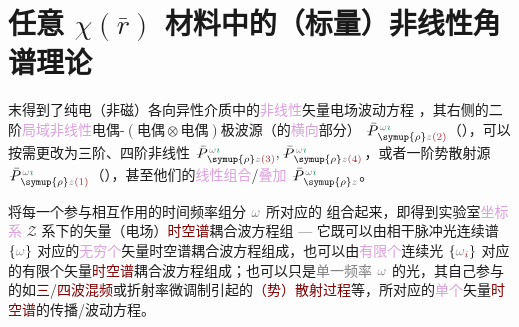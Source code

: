 \chapter{任意 \texorpdfstring{$\chi ( \bar{r} )$}{$\text{χ} ( \bar{r} )$} 材料中的（标量）非线性角谱理论}\label{chap:NLAST}

 末得到了\textcolor{PineGreen}{纯电（非磁）各向异性}介质中的\textcolor{Plum}{非线性}矢量电场波动方程 ，其右侧的二阶\textcolor{Plum}{局域}\textcolor{Plum}{非线性}\textcolor{NavyBlue}{电偶-$(\text{电偶}\otimes\text{电偶})$}极波源（的\textcolor{Plum}{横向}部分） $\Xint{\mathcolor{gray}{-}}{25}{\bar{P}}^{\;\! \mathcolor{gray}{\omega} \textcolor{PineGreen}{\imath}}_{\;\! \symup{\rho} \mathcolor{gray}{z} \textcolor{Maroon}{(2)}}$（），可以按需更改为三阶、四阶非线性 $\Xint{\mathcolor{gray}{-}}{25}{\bar{P}}^{\;\! \mathcolor{gray}{\omega} \textcolor{PineGreen}{\imath}}_{\;\! \symup{\rho} \mathcolor{gray}{z} \textcolor{Maroon}{(3)}}, \Xint{\mathcolor{gray}{-}}{25}{\bar{P}}^{\;\! \mathcolor{gray}{\omega} \textcolor{PineGreen}{\imath}}_{\;\! \symup{\rho} \mathcolor{gray}{z} \textcolor{Maroon}{(4)}}$，或者一阶势散射源 $\Xint{\mathcolor{gray}{-}}{25}{\bar{P}}^{\;\! \mathcolor{gray}{\omega} \textcolor{PineGreen}{\imath}}_{\;\! \symup{\rho} \mathcolor{gray}{z} \textcolor{Maroon}{(1)}}$（），甚至他们的\textcolor{Plum}{线性组合}/\textcolor{Plum}{叠加} $\Xint{\mathcolor{gray}{-}}{25}{\bar{P}}^{\;\! \mathcolor{gray}{\omega} \textcolor{PineGreen}{\imath}}_{\;\! \symup{\rho} \mathcolor{gray}{z}}$。

将每一个参与相互作用的时间频率组分 $\mathcolor{gray}{\omega}$ 所对应的  组合起来，即得到\textcolor{PineGreen}{实验室}\textcolor{Plum}{坐标系} \textcolor{PineGreen}{$\mathcal{Z}$ 系}下的矢量（电场）\textcolor{Maroon}{时空谱}耦合波方程组 --- 它既可以由相干脉冲光连续谱 $\{ \mathcolor{gray}{\omega} \}$ 对应的\textcolor{Plum}{无穷个}矢量时空谱耦合波方程组成，也可以由\textcolor{Plum}{有限个}连续光 $\{ \mathcolor{gray}{\omega}_{\textcolor{Maroon}{i}} \}$ 对应的有限个矢量\textcolor{Maroon}{时空谱}耦合波方程组成；也可以只是\textcolor{gray}{单一频率} $\mathcolor{gray}{\omega}$ 的光，其自己参与的如\textcolor{Maroon}{三}/\textcolor{Maroon}{四波混频}或\textcolor{PineGreen}{折射率微调制}引起的\textcolor{Maroon}{（势）散射过程}等，所对应的\textcolor{Plum}{单个}矢量\textcolor{Maroon}{时空谱}的传播/波动方程。

